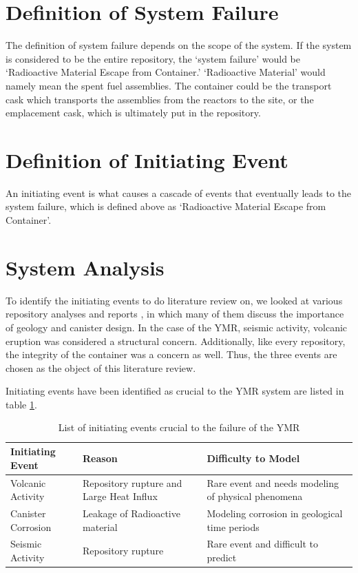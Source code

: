 \documentclass[12pt]{article}
\begin{document}
\section{Definition of System Failure}
The definition of system failure depends on the scope of the system.
If the system is considered to be the entire repository, the `system failure' would be
`Radioactive Material Escape from Container.'
`Radioactive Material' would namely mean the spent fuel assemblies.
The container could be the transport cask which transports the assemblies from
the reactors to the site, or the emplacement cask, which is ultimately put in the repository.


\section{Definition of Initiating Event}
An initiating event is what causes a cascade of events that eventually leads
to the system failure, which is defined above as `Radioactive Material Escape
from Container'. 


\section{System Analysis}
To identify the initiating events to do literature review on,
we looked at various repository analyses and reports \cite{u.s._department_of_energy_office_of_civilian_radioactive_waste_management_national_2008, wilson_total-system_1994, rechard_evolution_2014, u.s._department_of_energy_yucca_2002},
in which many of them discuss the importance of geology and canister design.
In the case of the \gls{YMR}, seismic activity, volcanic eruption was considered
a structural concern. Additionally, like every repository, the integrity
of the container was a concern as well. Thus, the three events are chosen
as the object of this literature review.

Initiating events have been identified as crucial to the 
\gls{YMR} system are listed in table \ref{tab:ie}.
\begin{table}[h]
    \centering
        \begin{tabularx}{\linewidth}{mbb}
            \hline
            \textbf{Initiating Event} & \textbf{Reason} & \textbf{Difficulty to Model} \\ \hline
            \small{Volcanic Activity} & Repository rupture and Large Heat Influx & Rare event and needs modeling of physical phenomena \cite{marzocchi_quantifying_2004} \\ 
            \small{Canister Corrosion} & Leakage of Radioactive material & Modeling corrosion in geological time periods \cite{sadiq_probabilistic_2004, oldenburg_low-probability_2016} \\
            \small{Seismic Activity} & Repository rupture & Rare event and difficult to predict \cite{ward_multidisciplinary_1994} \\ \hline
        \end{tabularx}
        \caption{List of initiating events crucial to the failure of the \gls{YMR}}
        \label{tab:ie}
\end {table}
\end{document}
